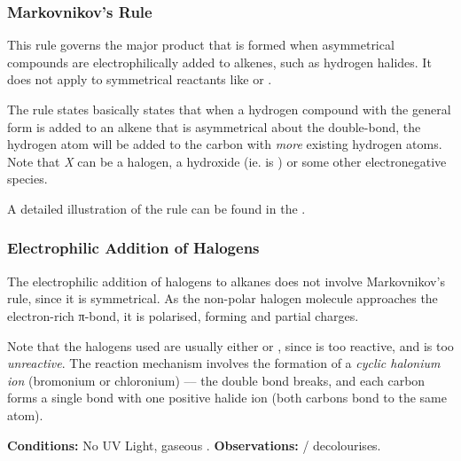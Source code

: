 

		\subsubsection{Markovnikov's Rule}

			This rule governs the major product that is formed when asymmetrical compounds are electrophilically added to alkenes,
			such as hydrogen halides. It does not apply to symmetrical reactants like  or .

			The rule states basically states that when a hydrogen compound with the general form  is added to an
			alkene that is asymmetrical about the double-bond, the hydrogen atom will be added to the carbon with \textit{more}
			existing hydrogen atoms. Note that \textit{X} can be a halogen, a hydroxide (ie.  is ) or some other
			electronegative species.

			A detailed illustration of the rule can be found in the \hyperlink{AddendumMarkovnikovsRuleIllustration}{}.






		\pagebreak
		\subsubsection{Electrophilic Addition of Halogens}

			The electrophilic addition of halogens to alkanes does not involve Markovnikov's rule, since it is symmetrical.
			As the non-polar halogen molecule approaches the electron-rich π-bond, it is polarised, forming \deltap{} and \deltam{} partial
			charges.

			Note that the halogens used are usually either  or , since  is too reactive, and
			 is too \textit{unreactive}. The reaction mechanism involves the formation of a \textit{cyclic halonium ion}
			(bromonium or chloronium) –– the double bond breaks, and each carbon forms a single bond with one positive halide ion
			(both carbons bond to the same atom).

			\vspace{1.5em}

			\vbox{\textbf{Conditions:}	\tabto{35mm}No UV Light, gaseous .}	%
			\vbox{\textbf{Observations:}\tabto{35mm}  /   decolourises.}

